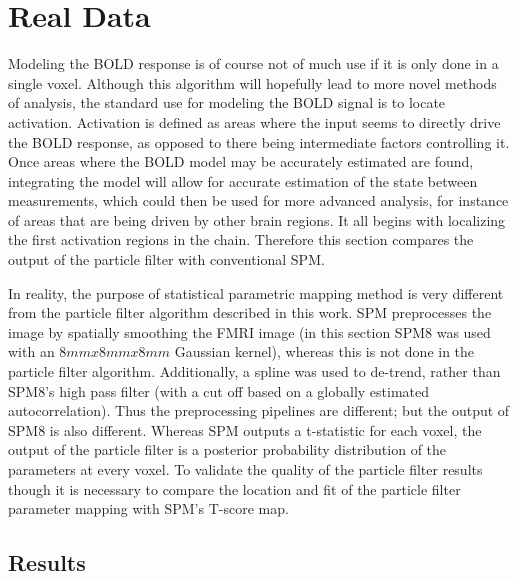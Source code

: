 \chapter{Real Data}
\label{sec:RealData}
Modeling the BOLD response is of course not of much use if it is only done in a 
single voxel. Although this algorithm will hopefully lead to more novel methods 
of analysis, the standard use for modeling the BOLD signal is to locate activation.
Activation is defined as areas where the input seems to directly drive
the BOLD response, as opposed to there being intermediate factors controlling it. 
Once areas where the BOLD 
model may be accurately estimated are found, integrating the model will allow for accurate
estimation of the state between measurements, which could then be used for more 
advanced analysis, for instance of areas that are being driven by other brain regions.
It all begins with localizing the first activation regions in the
chain. Therefore this section compares the output of the particle filter 
with conventional SPM. 

In reality, the purpose of statistical parametric mapping method is 
very different from the 
particle filter algorithm described in this work.
SPM preprocesses the image by spatially smoothing the FMRI image (in this section 
SPM8 was used with an $8mm x 8mm x 8mm$ Gaussian kernel), whereas
this is not done in the particle filter algorithm. Additionally, a spline
was used to de-trend, rather than SPM8's high pass filter (with a cut
off based on a globally estimated autocorrelation). Thus the preprocessing pipelines 
are different; but the output of SPM8 is also different. Whereas SPM outputs
a t-statistic for each voxel, the output 
of the particle filter is a posterior probability distribution of the parameters
at every voxel. To validate the quality of the particle filter results though
it is necessary to compare the location and fit of the particle filter parameter
mapping with SPM's T-score map. 

\section{Results}

